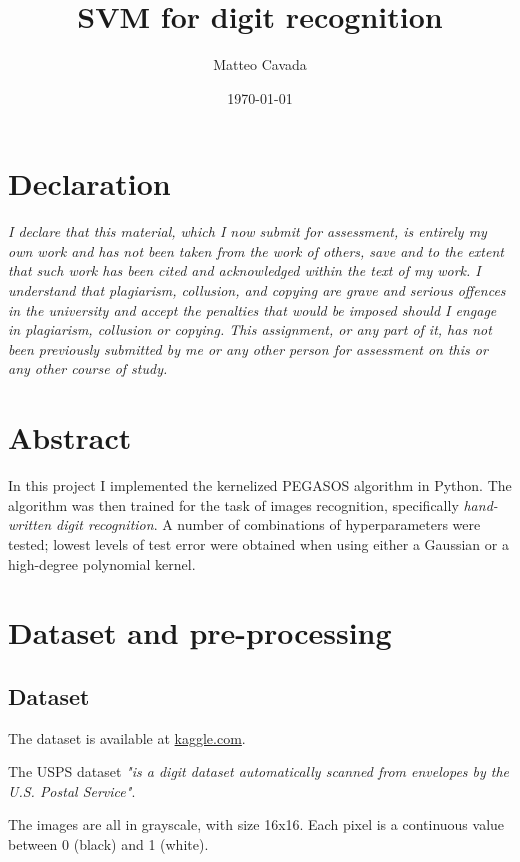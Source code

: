 \documentclass[a4paper]{article}
\author{Matteo Cavada}
\date{\today}
\title{SVM for digit recognition}
\begin{document}
\maketitle
\tableofcontents


\section{Declaration}
\label{sec:orgf4d55ba}

\emph{I declare that this material, which I now submit for assessment, is entirely my own work and has not been taken from the work of others, save and to the extent that such work has been cited and acknowledged within the text of my work. I understand that plagiarism, collusion, and copying are grave and serious offences in the university and accept the penalties that would be imposed should I engage in plagiarism, collusion or copying. This assignment, or any part of it, has not been previously submitted by me or any other person for assessment on this or any other course of study.}

\section{Abstract}
\label{sec:org20764bf}

In this project I implemented the kernelized PEGASOS algorithm in Python. The algorithm was then trained for the task of images recognition, specifically \emph{hand-written digit recognition}. A number of combinations of hyperparameters were tested; lowest levels of test error were obtained when using either a Gaussian or a high-degree polynomial kernel.

\section{Dataset and pre-processing}
\label{sec:org2e05c1a}

\subsection{Dataset}
\label{sec:org4b87ee3}

The dataset is available at \href{https://www.kaggle.com/datasets/bistaumanga/usps-dataset}{kaggle.com}.

The USPS dataset \cite{uspsdataset} \emph{"is a digit dataset automatically scanned from envelopes by the U.S. Postal Service"}.

The images are all in grayscale, with size 16x16. Each pixel is a continuous value between 0 (black) and 1 (white).
\end{document}
